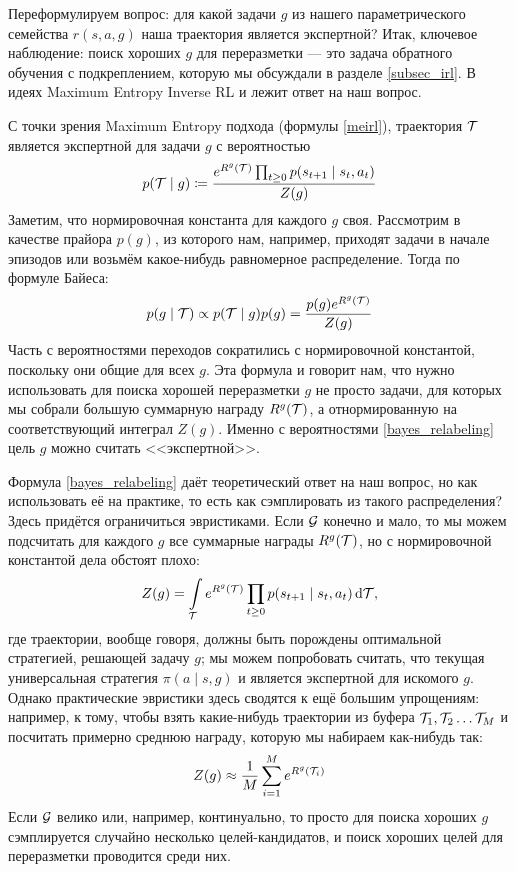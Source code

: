 Переформулируем вопрос: для какой задачи $g$ из нашего параметрического семейства $r(s, a, g)$ наша траектория является экспертной? Итак, ключевое наблюдение: поиск хороших $g$ для переразметки --- это задача обратного обучения с подкреплением, которую мы обсуждали в разделе \ref{subsec_irl}. В идеях Maximum Entropy Inverse RL и лежит ответ на наш вопрос.

С точки зрения Maximum Entropy подхода (формулы \eqref{meirl}), траектория $\mathcal{T}$ является экспертной для задачи $g$ с вероятностью
$$p(\mathcal{T} \mid g) \coloneqq \frac{e^{R^g(\mathcal{T})} \prod_{t \ge 0}p(s_{t+1} \mid s_t, a_t)}{Z(g)}$$
Заметим, что нормировочная константа для каждого $g$ своя. Рассмотрим в качестве прайора $p(g)$, из которого нам, например, приходят задачи в начале эпизодов или возьмём какое-нибудь равномерное распределение. Тогда по формуле Байеса:
\begin{equation}\label{bayes_relabeling}
p(g \mid \mathcal{T}) \propto p(\mathcal{T} \mid g)p(g) = \frac{p(g) e^{R^g(\mathcal{T})}}{Z(g)}
\end{equation}
Часть с вероятностями переходов сократились с нормировочной константой, поскольку они общие для всех $g$. Эта формула и говорит нам, что нужно использовать для поиска хорошей переразметки $g$ не просто задачи, для которых мы собрали большую суммарную награду $R^g(\mathcal{T})$, а отнормированную на соответствующий интеграл $Z(g)$. Именно с вероятностями \eqref{bayes_relabeling} цель $g$ можно считать <<экспертной>>.

Формула \eqref{bayes_relabeling} даёт теоретический ответ на наш вопрос, но как использовать её на практике, то есть как сэмплировать из такого распределения? Здесь придётся ограничиться эвристиками. Если $\mathcal{G}$ конечно и мало, то мы можем подсчитать для каждого $g$ все суммарные награды $R^g(\mathcal{T})$, но с нормировочной константой дела обстоят плохо: 
$$Z(g) = \int\limits_{\mathcal{T}} e^{R^g(\mathcal{T})} \prod_{t \ge 0}p(s_{t+1} \mid s_t, a_t) \mathop{}\!\mathrm{d} \mathcal{T},$$
где траектории, вообще говоря, должны быть порождены оптимальной стратегией, решающей задачу $g$; мы можем попробовать считать, что текущая универсальная стратегия $\pi(a \mid s, g)$ и является экспертной для искомого $g$. Однако практические эвристики здесь сводятся к ещё большим упрощениям: например, к тому, чтобы взять какие-нибудь траектории из буфера $\mathcal{T}_1, \mathcal{T}_2 \dots \mathcal{T}_M$ и посчитать примерно среднюю награду, которую мы набираем как-нибудь так:
$$Z(g) \approx \frac{1}{M} \sum_{i = 1}^M e^{R^g(\mathcal{T}_i)}$$
Если $\mathcal{G}$ велико или, например, континуально, то просто для поиска хороших $g$ сэмплируется случайно несколько целей-кандидатов, и поиск хороших целей для переразметки проводится среди них.

